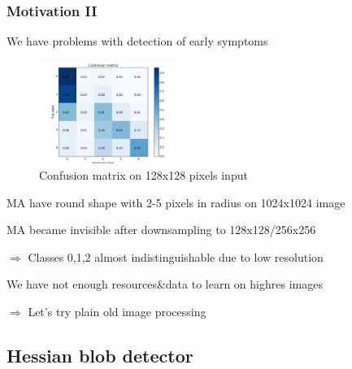 \begin{frame}\frametitle{Motivation II}
\par We have problems with detection of early symptoms
\par
\begin{figure}
\begin{center}
\vspace{-10pt}
\includegraphics[width=0.4\textwidth]{pics/submission_21_inner_squares_conv5_maxout.png}
\caption{Confusion matrix on 128x128 pixels input}
\vspace{-15pt}
\end{center}
\end{figure}

\par MA have round shape with 2-5 pixels in radius on 1024x1024 image 
\par MA became invisible after downsampling to 128x128/256x256
\par $\Rightarrow$ Classes 0,1,2 almost indistinguishable due to low resolution
\par We have not enough resources\&data to learn on highres images
\par $\Rightarrow$ Let's try plain old image processing

\end{frame}

\subsection{Hessian blob detector} 
\small

